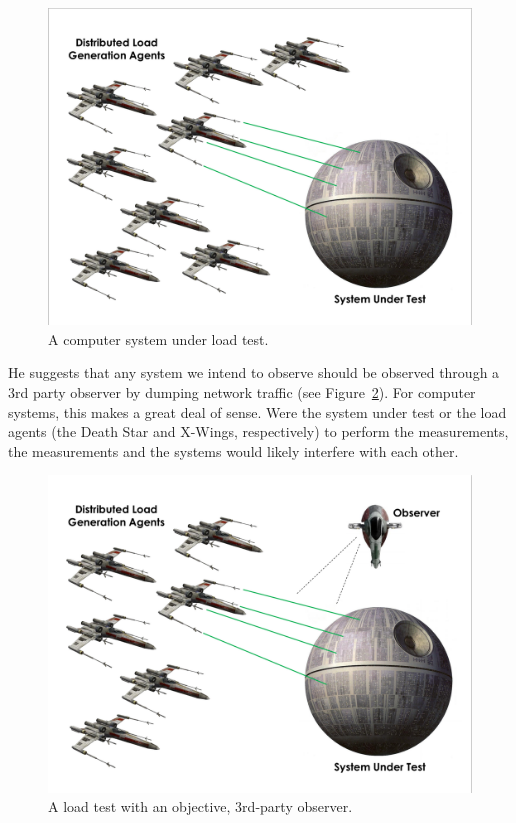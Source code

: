 \documentclass{article}
\begin{document}
\begin{figure}[h]
  \centering
  \includegraphics[width=\linewidth]{images/deathstar1.png}
  \caption{A computer system under load test.}
  \label{fig:load-test}
\end{figure}

He suggests that any system we intend to observe should be observed through a 3rd party observer by dumping network traffic (see Figure~\ref{fig:objective-load-test}). For computer systems, this makes a great deal of sense. Were the system under test or the load agents (the Death Star and X-Wings, respectively) to perform the measurements, the measurements and the systems would likely interfere with each other.

\begin{figure}[h]
  \centering
  \includegraphics[width=\linewidth]{images/deathstar2.png}
  \caption{A load test with an objective, 3rd-party observer.}
  \label{fig:objective-load-test}
\end{figure}
\end{document}
